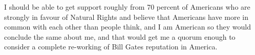 \documentclass{amsart}
\begin{document}
I should be able to get support roughly from 70 percent of Americans who are strongly in favour of Natural Rights and believe that Americans have more in common with each other than people think, and I am American so they would conclude the same about me, and that would get me a quorum enough to consider a complete re-working of Bill Gates reputation in America.

\begin{thebibliography}{CCC}
\end{thebibliography}
\end{document}
